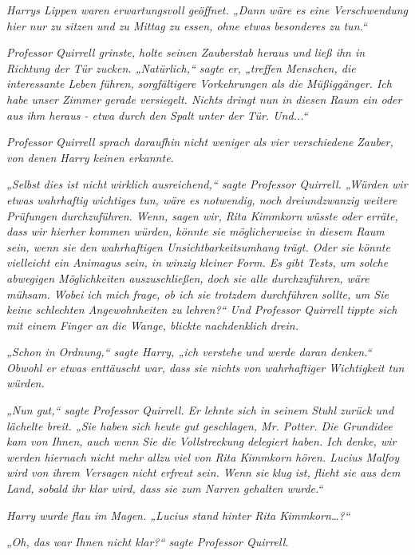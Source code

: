 {\emph{Harrys Lippen waren erwartungsvoll geöffnet. „Dann wäre es eine Verschwendung hier nur zu sitzen und zu Mittag zu essen, ohne etwas besonderes zu tun.“}

\emph{Professor Quirrell grinste, holte seinen Zauberstab heraus und ließ ihn in Richtung der Tür zucken. „Natürlich,“ sagte er, „treffen Menschen, die interessante Leben führen,} \emph{\emph{sorgfältigere}} \emph{Vorkehrungen als die Müßiggänger. Ich habe unser Zimmer gerade versiegelt. Nichts dringt nun in diesen Raum ein oder aus ihm heraus - etwa durch den Spalt unter der Tür. Und...“}

\emph{Professor Quirrell sprach daraufhin} \emph{nicht weniger als vier verschiedene} \emph{Zauber, von denen Harry keinen erkannte.}

\emph{„Selbst dies ist nicht} \emph{\emph{wirklich}} \emph{ausreichend,“ sagte Professor Quirrell. „Würden wir etwas wahrhaftig wichtiges tun, wäre es notwendig, noch dreiundzwanzig weitere Prüfungen durchzuführen. Wenn, sagen wir, Rita Kimmkorn wüsste oder erräte, dass wir hierher kommen würden, könnte sie möglicherweise in diesem Raum sein, wenn sie den wahrhaftigen Unsichtbarkeitsumhang trägt. Oder sie könnte vielleicht ein Animagus sein, in winzig kleiner Form. Es gibt Tests, um solche abwegigen Möglichkeiten auszuschließen, doch sie alle durchzuführen, wäre mühsam. Wobei ich mich frage, ob ich sie trotzdem durchführen sollte, um Sie keine schlechten Angewohnheiten zu lehren?“ Und Professor Quirrell tippte sich mit einem Finger an die Wange, blickte} \emph{nachdenklich} \emph{drein.}

\emph{„Schon in Ordnung,“ sagte Harry, „ich verstehe und werde daran denken.“ Obwohl er etwas enttäuscht war, dass sie nichts} \emph{von wahrhaftiger Wichtigkeit tun würden.}

\emph{„Nun gut,“ sagte Professor Quirrell. Er lehnte sich in seinem Stuhl zurück und lächelte breit. „Sie haben sich heute gut geschlagen, Mr. Potter. Die Grundidee kam von Ihnen, auch wenn Sie die} \emph{Vollstreckung} \emph{delegiert haben. Ich denke, wir werden hiernach nicht mehr} \emph{allzu} \emph{viel von Rita Kimmkorn hören. Lucius Malfoy wird von ihrem Versagen nicht erfreut sein. Wenn sie} \emph{klug} \emph{ist, flieht sie aus dem Land, sobald ihr klar wird, dass sie zum Narren gehalten wurde.“}

\emph{Harry wurde flau im Magen. „Lucius stand hinter Rita Kimmkorn…?“}

\emph{„Oh, das war Ihnen nicht klar?“ sagte Professor Quirrell.}

}
